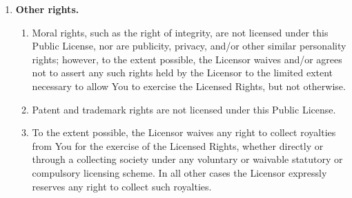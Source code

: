 \begin{enumerate}[label=(\alph*), leftmargin=1.8em, labelwidth=1.5em, align=left, itemsep=0.5em]
\begin{enumerate}[label=\arabic*., leftmargin=1.8em, labelwidth=1.2em, align=left, itemsep=0.4em]
\begin{enumerate}[label=(\alph*), leftmargin=1.8em, labelwidth=1.5em, align=left, itemsep=0.2em]
			            \item \textit{Additional offer from the Licensor --- Adapted Material.} Every recipient of Adapted Material from You automatically receives an offer from the Licensor to exercise the Licensed Rights in the Adapted Material under the conditions of the Adapter's License You apply.
			            \item \textit{No downstream restrictions.} You may not offer or impose any additional or different terms or conditions on, or apply any Effective Technological Measures to, the Licensed Material if doing so restricts exercise of the Licensed Rights by any recipient of the Licensed Material.
		            \end{enumerate}
		      \item \textbf{No endorsement.} Nothing in this Public License constitutes or may be construed as permission to assert or imply that You are, or that Your use of the Licensed Material is, connected with, or sponsored, endorsed, or granted official status by, the Licensor or others designated to receive attribution as provided in Section 3(a)(1)(A)(i).
	      \end{enumerate}

	\item \textbf{Other rights.}
	      \begin{enumerate}[label=\arabic*., leftmargin=1.8em, labelwidth=1.2em, align=left, itemsep=0.4em]
		      \item Moral rights, such as the right of integrity, are not licensed under this Public License, nor are publicity, privacy, and/or other similar personality rights; however, to the extent possible, the Licensor waives and/or agrees not to assert any such rights held by the Licensor to the limited extent necessary to allow You to exercise the Licensed Rights, but not otherwise.
		      \item Patent and trademark rights are not licensed under this Public License.
		      \item To the extent possible, the Licensor waives any right to collect royalties from You for the exercise of the Licensed Rights, whether directly or through a collecting society under any voluntary or waivable statutory or compulsory licensing scheme. In all other cases the Licensor expressly reserves any right to collect such royalties.
	      \end{enumerate}
\end{enumerate}

